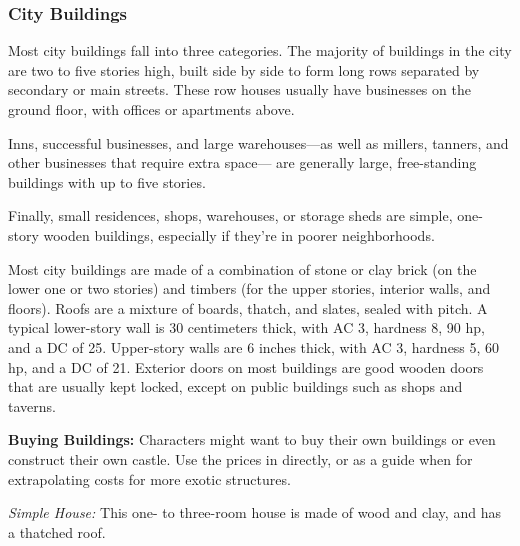 \subsubsection{City Buildings}
Most city buildings fall into three categories. The majority of buildings in the city are two to five stories high, built side by side to form long rows separated by secondary or main streets. These row houses usually have businesses on the ground floor, with offices or apartments above.

Inns, successful businesses, and large warehouses---as well as millers, tanners, and other businesses that require extra space--- are generally large, free-standing buildings with up to five stories.

Finally, small residences, shops, warehouses, or storage sheds are simple, one-story wooden buildings, especially if they're in poorer neighborhoods.

Most city buildings are made of a combination of stone or clay brick (on the lower one or two stories) and timbers (for the upper stories, interior walls, and floors). Roofs are a mixture of boards, thatch, and slates, sealed with pitch. A typical lower-story wall is 30 centimeters thick, with AC 3, hardness 8, 90 hp, and a  DC of 25. Upper-story walls are 6 inches thick, with AC 3, hardness 5, 60 hp, and a  DC of 21. Exterior doors on most buildings are good wooden doors that are usually kept locked, except on public buildings such as shops and taverns.

\textbf{Buying Buildings:} Characters might want to buy their own buildings or even construct their own castle. Use the prices in  directly, or as a guide when for extrapolating costs for more exotic structures.

\textit{Simple House:} This one- to three-room house is made of wood and clay, and has a thatched roof.

